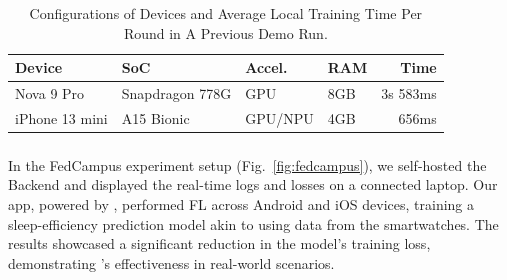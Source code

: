\documentclass[conference]{IEEEtran}
\begin{document}
\begin{table}
    \centering
    \small
    \setlength{\tabcolsep}{3pt}
\begin{tabular}{llllr}
Device          & SoC               & Accel.        & RAM   & Time      \\\hline
Nova 9 Pro      & Snapdragon 778G   & GPU           & 8GB   & 3s 583ms  \\
iPhone 13 mini  & A15 Bionic        & GPU/NPU       & 4GB   & 656ms     \\
\end{tabular}
\caption{Configurations of Devices and Average Local Training Time Per Round in
    A Previous Demo Run.
}
\label{tbl:demo-stats}
\end{table}

\subsubsection{\FedCampus{}}
In the FedCampus experiment setup (Fig.~\ref{fig:fedcampus}),
we self-hosted the Backend
and displayed the real-time logs and losses on a connected laptop.
Our app, powered by \FedKit{},
performed FL across Android and iOS devices,
training a sleep-efficiency prediction model
akin to \cite{khoa2022fedmcrnn}
using data from the smartwatches.
The results showcased a significant reduction in the model's training loss,
demonstrating \FedKit{}'s effectiveness in real-world scenarios.




\vspace{12pt}
\color{red}
\end{document}
